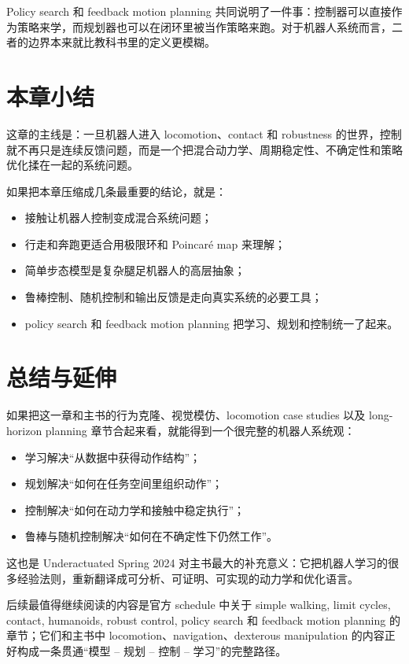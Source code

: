\documentclass[a4paper]{article}
\begin{document}
Policy search 和 feedback motion planning 共同说明了一件事：控制器可以直接作为策略来学，而规划器也可以在闭环里被当作策略来跑。对于机器人系统而言，二者的边界本来就比教科书里的定义更模糊。

\section{本章小结}

这章的主线是：一旦机器人进入 locomotion、contact 和 robustness 的世界，控制就不再只是连续反馈问题，而是一个把混合动力学、周期稳定性、不确定性和策略优化揉在一起的系统问题。

如果把本章压缩成几条最重要的结论，就是：
\begin{itemize}
  \item 接触让机器人控制变成混合系统问题；
  \item 行走和奔跑更适合用极限环和 Poincar\'e map 来理解；
  \item 简单步态模型是复杂腿足机器人的高层抽象；
  \item 鲁棒控制、随机控制和输出反馈是走向真实系统的必要工具；
  \item policy search 和 feedback motion planning 把学习、规划和控制统一了起来。
\end{itemize}

\section{总结与延伸}

如果把这一章和主书的行为克隆、视觉模仿、locomotion case studies 以及 long-horizon planning 章节合起来看，就能得到一个很完整的机器人系统观：
\begin{itemize}
  \item 学习解决“从数据中获得动作结构”；
  \item 规划解决“如何在任务空间里组织动作”；
  \item 控制解决“如何在动力学和接触中稳定执行”；
  \item 鲁棒与随机控制解决“如何在不确定性下仍然工作”。
\end{itemize}

这也是 Underactuated Spring 2024 对主书最大的补充意义：它把机器人学习的很多经验法则，重新翻译成可分析、可证明、可实现的动力学和优化语言。

后续最值得继续阅读的内容是官方 schedule 中关于 simple walking, limit cycles, contact, humanoids, robust control, policy search 和 feedback motion planning 的章节；它们和主书中 locomotion、navigation、dexterous manipulation 的内容正好构成一条贯通“模型 -- 规划 -- 控制 -- 学习”的完整路径。
\end{document}
